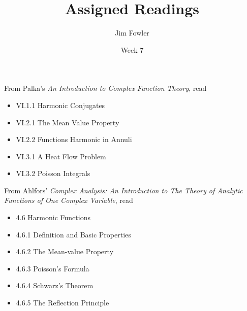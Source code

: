 \documentclass{homework}
\author{Jim Fowler}
\title{Assigned Readings}
\date{Week 7}
\begin{document}
\maketitle


From Palka's \textit{An Introduction to Complex Function Theory}, read
\begin{itemize}
\item VI.1.1 Harmonic Conjugates
\item VI.2.1 The Mean Value Property
\item VI.2.2 Functions Harmonic in Annuli
\item VI.3.1 A Heat Flow Problem
\item VI.3.2 Poisson Integrals
\end{itemize}

From Ahlfors' \textit{Complex Analysis: An Introduction to The Theory of Analytic Functions of One Complex Variable}, read
\begin{itemize}
\item 4.6 Harmonic Functions
\item 4.6.1 Definition and Basic Properties
\item 4.6.2 The Mean-value Property
\item 4.6.3 Poisson's Formula
\item 4.6.4 Schwarz's Theorem
\item 4.6.5 The Reflection Principle
\end{itemize}
\end{document}

